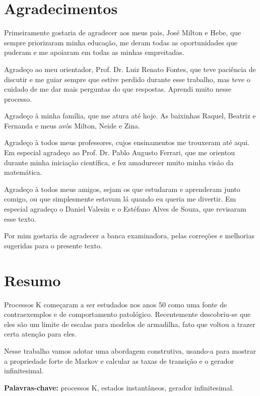 \chapter*{Agradecimentos}

Primeiramente gostaria de agradecer aos meus pais, José Milton e Hebe,
que sempre priorizaram minha educação, me deram todas as oportunidades
que puderam e me apoiaram em todas as minhas empreitadas.

Agradeço ao meu orientador, Prof. Dr. Luiz Renato Fontes, que teve
paciência de discutir e me guiar sempre que estive perdido durante
esse trabalho, mas teve o cuidado de me dar mais perguntas do que
respostas. Aprendi muito nesse processo.

Agradeço à minha família, que me atura até hoje. As baixinhas Raquel,
Beatriz e Fernanda e meus avós Milton, Neide e Zina.

Agradeço à todos meus professores, cujos ensinamentos me trouxeram até
aqui. Em especial agradeço ao Prof. Dr. Pablo Augusto Ferrari, que me
orientou durante minha iniciação científica, e fez amadurecer muito
minha visão da matemática.

Agradeço à todos meus amigos, sejam os que estudaram e aprenderam
junto comigo, ou que simplesmente estavam lá quando eu queria me
divertir. Em especial agradeço o Daniel Valesin e o Estéfano Alves de
Souza, que revisaram esse texto.

Por mim gostaria de agradecer a banca examinadora, pelas correções e
melhorias sugeridas para o presente texto.

\chapter*{Resumo}

Processos K começaram a ser estudados nos anos 50 como uma fonte de
contraexemplos e de comportamento patológico. Recentemente
descobriu-se que eles são um limite de escalas para modelos de
armadilha, fato que voltou a trazer certa atenção para eles.

Nesse trabalho vamos adotar uma abordagem construtiva, usando-a para
mostrar a propriedade forte de Markov e calcular as taxas de transição
e o gerador infinitesimal.

\noindent \textbf{Palavras-chave:} processos K, estados instantâneos,
gerador infinitesimal.

